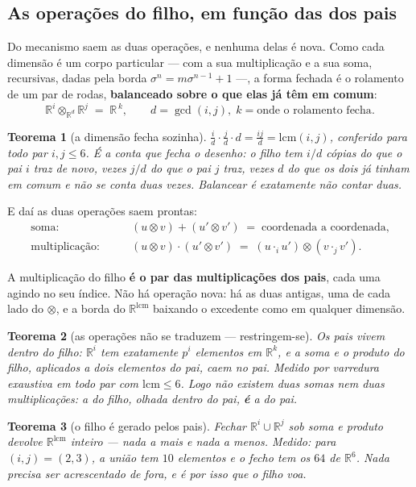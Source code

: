 \documentclass[11pt]{article}
\newcommand{\R}{\mathbb R}
\theoremstyle{plain}
\newtheorem{teorema}{Teorema}
\theoremstyle{remark}
\begin{document}
\subsection{As operações do filho, em função das dos pais}

Do mecanismo saem as duas operações, e nenhuma delas é nova. Como cada dimensão é um corpo particular
--- com a sua multiplicação e a sua soma, recursivas, dadas pela borda $\sigma^n=m\sigma^{n-1}+1$ ---,
a forma fechada é o rolamento de um par de rodas, \textbf{balanceado sobre o que elas já têm em
comum}:
\[
 \boxed{\;\R^i\otimes_{\R^d}\R^j \;=\; \R^{\,k},\qquad d=\gcd(i,j),\;
 k=\text{onde o rolamento fecha}.\;}
\]

\begin{teorema}[a dimensão fecha sozinha]
$\displaystyle \frac{i}{d}\cdot\frac{j}{d}\cdot d=\frac{ij}{d}=\mathrm{lcm}(i,j)$, conferido para
todo par $i,j\le 6$. É a conta que fecha o desenho: o filho tem $i/d$ cópias do que o pai $i$ traz de
novo, vezes $j/d$ do que o pai $j$ traz, vezes $d$ do que os dois \emph{já tinham em comum e não se
conta duas vezes}. Balancear é exatamente não contar duas.
\end{teorema}

\noindent E daí as duas operações saem prontas:
\begin{align}
 \text{soma:}&\qquad (u\otimes v)+(u'\otimes v') \;=\; \text{coordenada a coordenada,}\\[2pt]
 \text{multiplicação:}&\qquad (u\otimes v)\cdot(u'\otimes v') \;=\; (u\cdot_i u')\otimes(v\cdot_j v').
\end{align}

\noindent A multiplicação do filho \textbf{é o par das multiplicações dos pais}, cada uma agindo no
seu índice. Não há operação nova: há as duas antigas, uma de cada lado do $\otimes$, e a borda do
$\R^{\mathrm{lcm}}$ baixando o excedente como em qualquer dimensão.

\begin{teorema}[as operações não se traduzem --- restringem-se]
Os pais vivem \emph{dentro} do filho: $\R^i$ tem exatamente $p^i$ elementos em $\R^k$, e a soma e o
produto do filho, aplicados a dois elementos do pai, caem no pai. Medido por varredura exaustiva em
todo par com $\mathrm{lcm}\le6$. Logo não existem duas somas nem duas multiplicações: a do filho,
olhada dentro do pai, \textbf{é} a do pai.
\end{teorema}

\begin{teorema}[o filho é gerado pelos pais]
Fechar $\R^i\cup\R^j$ sob soma e produto devolve $\R^{\mathrm{lcm}}$ \emph{inteiro} --- nada a mais e
nada a menos. Medido: para $(i,j)=(2,3)$, a união tem $10$ elementos e o fecho tem os $64$ de $\R^6$.
Nada precisa ser acrescentado de fora, e é por isso que o filho voa.
\end{teorema}
\end{document}
